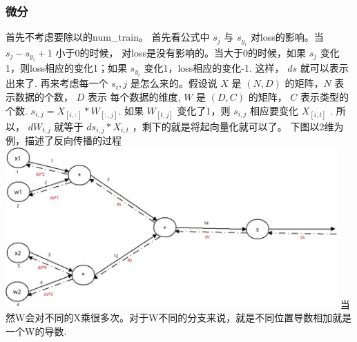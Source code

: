 \documentclass[fontset = none]{ctexart}
\begin{document}
\subsubsection{微分}
首先不考虑要除以的num\_train。
首先看公式中 $s_j$ 与 $s_{y_i}$ 对loss的影响。当 $s_j - s_{y_i} + 1$ 小于0的时候，
对loss是没有影响的。当大于0的时候，如果 $s_j$ 变化1，则loss相应的变化1；如果 $s_{y_i}$
变化1，loss相应的变化-1. 这样， $ds$ 就可以表示出来了.
再来考虑每一个 $s_i,j$ 是怎么来的。假设说 $X$ 是 $(N,D)$ 的矩阵，$N$ 表示数据的个数， $D$ 表示
每个数据的维度, $W$ 是 $(D,C)$ 的矩阵， $C$ 表示类型的个数. $s_{i,j} = X_{[i,:]} * W_{[:,j]}$.
如果 $W_{[t,j]}$ 变化了1，则 $s_{i,j}$ 相应要变化 $X_{[i,t]}$ . 所以， $dW_{t,j}$ 就等于
$ds_{i,j} * X_{i,t}$ ，剩下的就是将起向量化就可以了。
下图以2维为例，描述了反向传播的过程
\includegraphics[width=5in]{./assignment1_pic/svm_loss_vectorized.jpg}
当然W会对不同的X乘很多次。对于W不同的分支来说，就是不同位置导数相加就是一个W的导数.
\end{document}
